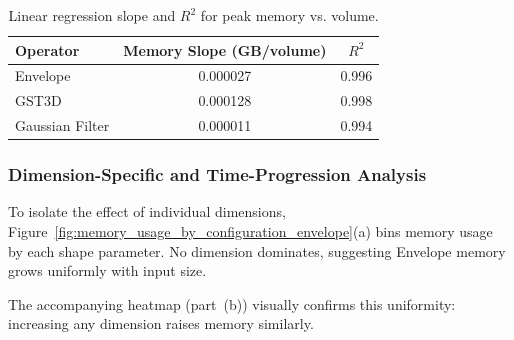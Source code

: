 \begin{table}[htbp]
    \centering
    \begin{tabular}{lcc}
        \hline
        \textbf{Operator} & \textbf{Memory Slope (GB/volume)} & \textbf{$R^2$} \\
        \hline
        Envelope          & 0.000027                          & 0.996          \\
        \ac{GST3D}        & 0.000128                          & 0.998          \\
        Gaussian Filter   & 0.000011                          & 0.994          \\
        \hline
    \end{tabular}
    \caption{Linear regression slope and $R^2$ for peak memory vs. volume.}
    \label{tab:scaling_slopes_summary}
\end{table}

\subsubsection{Dimension-Specific and Time-Progression Analysis}
\label{subsec:dimension-specific-and-time-progression-analysis}

To isolate the effect of individual dimensions, Figure~\ref{fig:memory_usage_by_configuration_envelope}(a) bins memory usage by each shape parameter.
No dimension dominates, suggesting Envelope memory grows uniformly with input size.

The accompanying heatmap (part~(b)) visually confirms this uniformity: increasing any dimension raises memory similarly.

